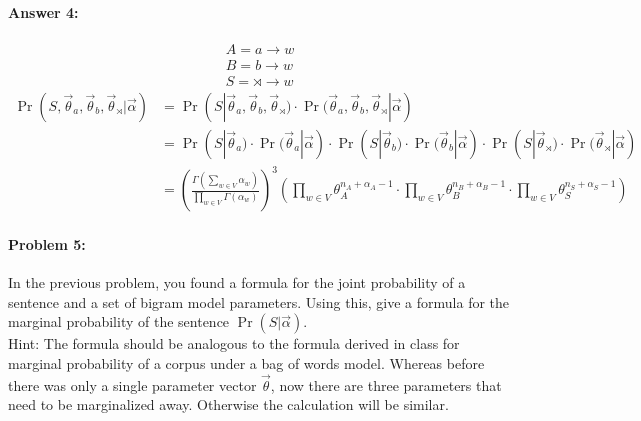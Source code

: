 \documentclass[12pt, letterpaper]{article}
\begin{document}
\paragraph{Answer 4:}\begin{gather*}
    A = a\rightarrow w\\
    B = b \rightarrow w\\
    S = \rtimes \rightarrow w
\end{gather*}
\begin{align*}
    \Pr(S, \vec{\theta}_{a}, \vec{\theta}_{b}, \vec{\theta}_{\rtimes} | \vec{\alpha}) &= \Pr(S | \vec{\theta}_{a}, \vec{\theta}_{b}, \vec{\theta}_{\rtimes})\cdot{\Pr(\vec{\theta}_{a}}, \vec{\theta}_{b}, \vec{\theta}_{\rtimes}|\vec{\alpha})\\
    &= \Pr(S | \vec{\theta}_{a})\cdot{\Pr(\vec{\theta}_{a}}|\vec{\alpha})\cdot{
    \Pr(S | \vec{\theta}_{b})\cdot{\Pr(\vec{\theta}_{b}}|\vec{\alpha})\cdot{
    \Pr(S | \vec{\theta}_{\rtimes})\cdot{\Pr(\vec{\theta}_{\rtimes}}|\vec{\alpha})}}\\
    &= \left(\frac{\Gamma(\sum_{w \in V} \alpha_{w})}{\prod_{w \in V} \Gamma(\alpha_{w})}\right)^3 \left(
    \prod_{w \in V} \theta_{A}^{n_A+\alpha_{A}-1}\cdot{
    \prod_{w \in V} \theta_{B}^{n_B+\alpha_{B}-1}\cdot{
    \prod_{w \in V} \theta_{S}^{n_S+\alpha_{S}-1}}}\right)
\end{align*}

\hrulefill
\paragraph{Problem 5:}

In the previous problem, you found a formula for the joint probability
of a sentence and a set of bigram model parameters. Using this, give a
formula for the marginal probability of the sentence
$\Pr(S|\vec{\alpha})$.\\

\noindent Hint: The formula should be analogous to the formula derived
in class for marginal probability of a corpus under a bag of words
model. Whereas before there was only a single parameter vector
$\vec{\theta}$, now there are three parameters that need to be
marginalized away. Otherwise the calculation will be similar.
\end{document}
